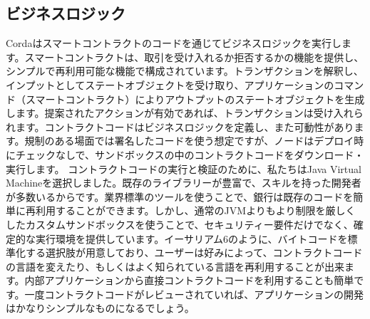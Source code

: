 \documentclass{article}
\begin{document}
\subsection{ビジネスロジック}
Cordaはスマートコントラクトのコードを通じてビジネスロジックを実行します。スマートコントラクトは、取引を受け入れるか拒否するかの機能を提供し、シンプルで再利用可能な機能で構成されています。トランザクションを解釈し、インプットとしてステートオブジェクトを受け取り、アプリケーションのコマンド（スマートコントラクト）によりアウトプットのステートオブジェクトを生成します。提案されたアクションが有効であれば、トランザクションは受け入れられます。コントラクトコードはビジネスロジックを定義し、また可動性があります。規制のある場面では署名したコードを使う想定ですが、ノードはデプロイ時にチェックなしで、サンドボックスの中のコントラクトコードをダウンロード・実行します。
コントラクトコードの実行と検証のために、私たちはJava Virtual Machine\cite{JVM}を選択しました。既存のライブラリーが豊富で、スキルを持った開発者が多数いるからです。業界標準のツールを使うことで、銀行は既存のコードを簡単に再利用することができます。しかし、通常のJVMよりもより制限を厳しくしたカスタムサンドボックスを使うことで、セキュリティー要件だけでなく、確定的な実行環境を提供しています。イーサリアム6のように、バイトコードを標準化する選択肢が用意しており、ユーザーは好みによって、コントラクトコードの言語を変えたり、もしくはよく知られている言語を再利用することが出来ます。内部アプリケーションから直接コントラクトコードを利用することも簡単です。一度コントラクトコードがレビューされていれば、アプリケーションの開発はかなりシンプルなものになるでしょう。
\end{document}
